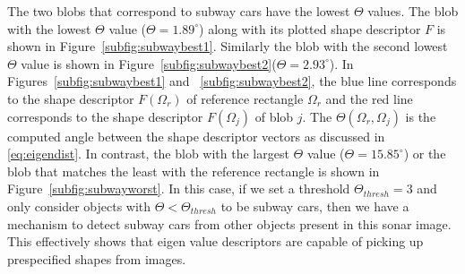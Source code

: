 \documentclass {udthesis}
\begin{document}
The two blobs that correspond to subway cars have the lowest $\Theta$ values. The blob with the lowest $\Theta$ value ($\Theta=1.89^{\circ}$) along with its plotted shape descriptor $F$ is shown in Figure~\ref{subfig:subwaybest1}. Similarly the blob with the second lowest $\Theta$ value is shown in Figure~\ref{subfig:subwaybest2}($\Theta=2.93^{\circ}$). In Figures~\ref{subfig:subwaybest1} and ~\ref{subfig:subwaybest2}, the blue line corresponds to the shape descriptor $F(\Omega_r)$ of reference rectangle $\Omega_r$ and the red line corresponds to the shape descriptor $F(\Omega_j)$ of blob $j$. The $\Theta(\Omega_r,\Omega_j)$ is the computed angle between the shape descriptor vectors as discussed in \eqref{eq:eigendist}. In contrast, the blob with the largest $\Theta$ value ($\Theta=15.85^{\circ}$) or the blob that matches the least with the reference rectangle is shown in Figure~\ref{subfig:subwayworst}. In this case, if we set a threshold $\Theta_{thresh}=3$ and only consider objects with $\Theta<\Theta_{thresh}$ to 
be subway cars, then we have a mechanism to detect subway cars from other objects present in this sonar image. This effectively shows that eigen value descriptors are capable of picking up prespecified shapes from images.
\end{document}
